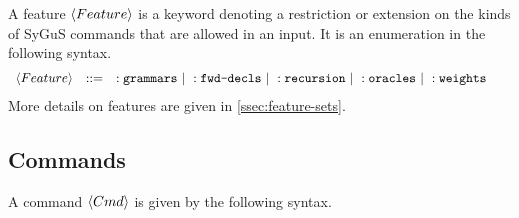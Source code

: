 \documentclass[english,a4paper,10pt]{article}
\begin{document}
A feature $\left\langle Feature\right\rangle$ is a keyword denoting a restriction or extension
on the kinds of SyGuS commands that are allowed in an input.
It is an enumeration in the following syntax.
\begin{alignat*}{1}
 & \begin{array}{rcl}
 \left\langle Feature\right\rangle & ::= & :\texttt{grammars}\mbox{ }|\mbox{ }:\texttt{fwd-decls}\mbox{ }|\mbox{ }:\texttt{recursion}\mbox{ }|\mbox{ } :\texttt{oracles}\mbox{ }|\mbox{ } :\texttt{weights}\mbox{ }
\end{array}
\end{alignat*}
More details on features are given in \cref{ssec:feature-sets}.

\subsection{Commands}

A command $\left\langle Cmd\right\rangle$ is given by the following syntax.
\end{document}
